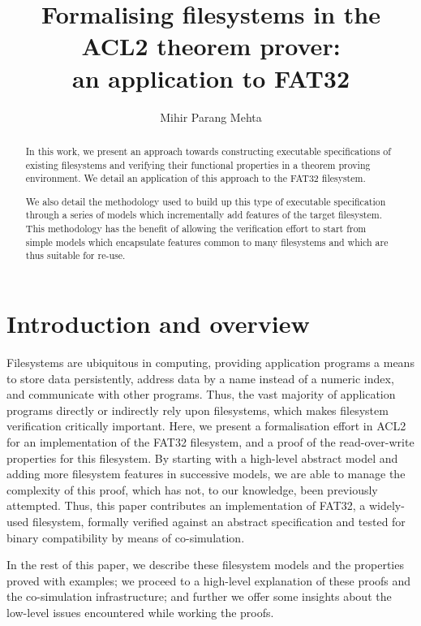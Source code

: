 \documentclass[submission,copyright,creativecommons]{eptcs}
\title{Formalising filesystems in the ACL2 theorem prover:\\ an
  application to FAT32}
\author{Mihir Parang Mehta
\institute{Department of Computer Science\\
University of Texas at Austin\\
Austin, TX, USA}
\email{mihir@cs.utexas.edu}}
\begin{document}
\maketitle

\begin{abstract}
In this work, we present an
approach towards constructing executable specifications of existing
filesystems and verifying their functional properties in a theorem
proving environment. We detail an application of this approach to the
FAT32 filesystem.

We also detail the methodology used to build up this type of
executable specification through a series of models which
incrementally add features of the target filesystem. This methodology
has the benefit of allowing the verification effort to start from
simple models which encapsulate features common to many filesystems
and which are thus suitable for re-use.
\end{abstract}

\section{Introduction and overview}

Filesystems are ubiquitous in computing, providing application
programs a means to store data persistently, address data by a name
instead of a numeric index, and communicate with other programs.
Thus, the vast majority of application programs
directly or indirectly rely upon filesystems, which makes filesystem
verification critically important. Here, we present a
formalisation effort in ACL2 for an implementation of the FAT32
filesystem, and a proof of the read-over-write properties for this
filesystem. By starting with a high-level abstract model and adding
more filesystem features in successive models, we are able to manage the
complexity of this proof, which has not, to our knowledge, been
previously attempted. Thus, this paper contributes an implementation
of FAT32, a widely-used filesystem, formally verified against an
abstract specification and tested for binary compatibility by means of
co-simulation.

In the rest of this paper, we describe these filesystem
models and the properties proved with examples; we proceed to a
high-level explanation of these proofs and the co-simulation
infrastructure; and further we offer some insights about the low-level
issues encountered while working the proofs.
\end{document}
